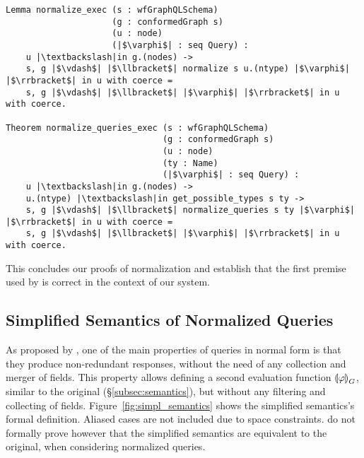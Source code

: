 \begin{verbatim}
Lemma normalize_exec (s : wfGraphQLSchema)
                     (g : conformedGraph s)
                     (u : node)
                     (|$\varphi$| : seq Query) :
    u |\textbackslash|in g.(nodes) ->
    s, g |$\vdash$| |$\llbracket$| normalize s u.(ntype) |$\varphi$| |$\rrbracket$| in u with coerce =
    s, g |$\vdash$| |$\llbracket$| |$\varphi$| |$\rrbracket$| in u with coerce.

Theorem normalize_queries_exec (s : wfGraphQLSchema)
                               (g : conformedGraph s)
                               (u : node)
                               (ty : Name)
                               (|$\varphi$| : seq Query) :
    u |\textbackslash|in g.(nodes) ->
    u.(ntype) |\textbackslash|in get_possible_types s ty ->
    s, g |$\vdash$| |$\llbracket$| normalize_queries s ty |$\varphi$| |$\rrbracket$| in u with coerce =
    s, g |$\vdash$| |$\llbracket$| |$\varphi$| |$\rrbracket$| in u with coerce.

\end{verbatim}

This concludes our proofs of normalization and establish that the first premise used by \HP is correct in the context of our system.

\subsection{Simplified Semantics of Normalized Queries}
\label{sec:simpl-semantics}

As proposed by \HP, one of the main properties of queries in normal form is that they produce non-redundant responses, without the need of any collection and merger of fields. This property allows defining a second evaluation function $\llparenthesis \varphi \rrparenthesis^{}_{G}$, similar to the original (\S\ref{subsec:semantics}), but without any filtering and collecting of fields. Figure~\ref{fig:simpl_semantics} shows the simplified semantics's formal definition. Aliased cases are not included due to space constraints.
\HP do not formally prove however that the simplified semantics are equivalent to the original, when considering normalized queries.


